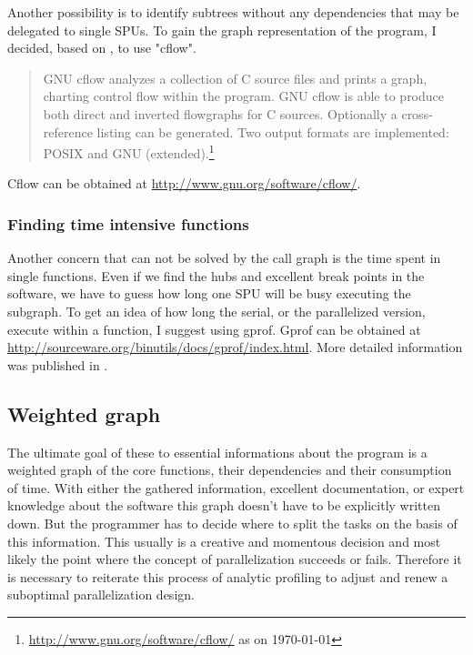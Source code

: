 Another possibility is to identify subtrees without any dependencies that may be delegated to single SPUs.
To gain the graph representation of the program, I decided, based on \cite{graphanalysis}, to use "cflow".

\begin{quote}
GNU cflow analyzes a collection of C source files and prints a graph, charting control flow within the program.
\noindent
GNU cflow is able to produce both direct and inverted flowgraphs for C sources. Optionally a cross-reference listing can be generated. Two output formats are implemented: POSIX and GNU (extended).\footnote{\url{http://www.gnu.org/software/cflow/} as on \today}
\end{quote}
Cflow can be obtained at \url{http://www.gnu.org/software/cflow/}.

\subsubsection{Finding time intensive functions}
\label{subsubsec:time}
Another concern that can not be solved by the call graph is the time spent in single functions. Even if we find the hubs and excellent break points in the software, we have to guess how long one SPU will be busy executing the subgraph. To get an idea of how long the serial, or the parallelized version, execute within a function, I suggest using gprof.
Gprof can be obtained at \url{http://sourceware.org/binutils/docs/gprof/index.html}. More detailed information was published in \cite{gprof}.

\subsection{Weighted graph}
\label{subsec:weigthed}
The ultimate goal of these to essential informations about the program is a weighted graph of the core functions, their dependencies and their consumption of time.
With either the gathered information, excellent documentation, or expert knowledge about the software this graph doesn't have to be explicitly written down. But the programmer has to decide where to split the tasks on the basis of this information. This usually is a creative and momentous decision and most likely the point where the concept of parallelization succeeds or fails. Therefore it is necessary to reiterate this process of analytic profiling to adjust and renew a suboptimal parallelization design.


